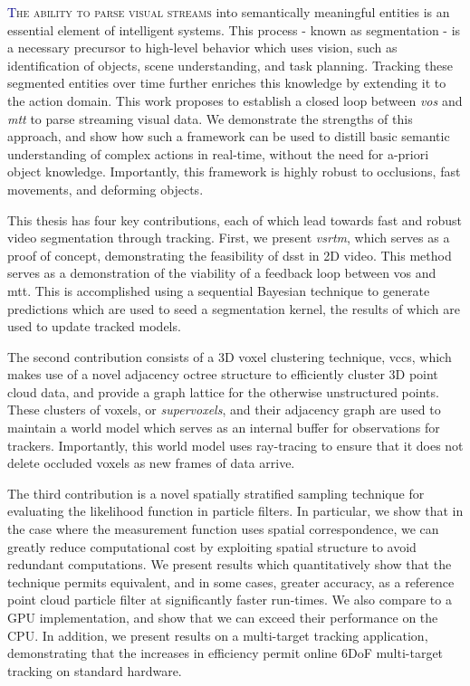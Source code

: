 \lettrine[lines=2, loversize=0.3]{\textcolor{DarkBlue}T}{he ability to parse visual streams} into semantically meaningful entities is an essential element of intelligent systems. This process - known as segmentation - is a necessary precursor to high-level behavior which uses vision, such as identification of objects, scene understanding, and task planning. Tracking these segmented entities over time further enriches this knowledge by extending it to the action domain. This work proposes to establish a closed loop between \emph{\gls{vos}} and \emph{\gls{mtt}} to parse streaming visual data. We demonstrate the strengths of this approach, and show how such a framework can be used to distill basic semantic understanding of complex actions in real-time, without the need for a-priori object knowledge. Importantly, this framework is highly robust to occlusions, fast movements, and deforming objects. 

This thesis has four key contributions, each of which lead towards fast and robust video segmentation through tracking. First, we present \emph{\gls{vsrtm}}, which serves as a proof of concept, demonstrating the feasibility of \gls{dsst} in 2D video. This method serves as a demonstration of the viability of a feedback loop between \gls{vos} and \gls{mtt}. This is accomplished using a sequential Bayesian technique to generate predictions which are used to seed a segmentation kernel, the results of which are used to update tracked models. 

The second contribution consists of a 3D voxel clustering technique, \gls{vccs}, which makes use of a novel adjacency octree structure to efficiently cluster 3D point cloud data, and provide a graph lattice for the otherwise unstructured points. These clusters of voxels, or \emph{supervoxels}, and their adjacency graph are used to maintain a world model which serves as an internal buffer for observations for trackers. Importantly, this world model uses ray-tracing to ensure that it does not delete occluded voxels as new frames of data arrive.

The third contribution is a novel spatially stratified sampling technique for evaluating the likelihood function in particle filters. In particular, we show that in the case where the measurement function uses spatial correspondence, we can greatly reduce computational cost by exploiting spatial structure to avoid redundant computations. We present results which quantitatively show that the technique permits equivalent, and in some cases, greater accuracy, as a reference point cloud particle filter at significantly faster run-times. We also compare to a GPU implementation, and show that we can exceed their performance on the CPU. In addition, we present results on a multi-target tracking application, demonstrating that the increases in efficiency permit online 6DoF multi-target tracking on standard hardware.

